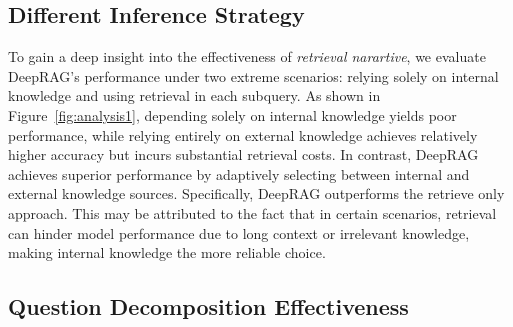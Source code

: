 \subsection{Different Inference Strategy}

To gain a deep insight into the effectiveness of \textit{retrieval narartive}, we evaluate DeepRAG's performance under two extreme scenarios: relying solely on internal knowledge and using retrieval in each subquery.
% 
As shown in Figure~\ref{fig:analysis1}, depending solely on internal knowledge yields poor performance, while relying entirely on external knowledge achieves relatively higher accuracy but incurs substantial retrieval costs.
In contrast, DeepRAG achieves superior performance by adaptively selecting between internal and external knowledge sources.
% 
Specifically, DeepRAG outperforms the retrieve only approach. This may be attributed to the fact that in certain scenarios, retrieval can hinder model performance due to long context or irrelevant knowledge, making internal knowledge the more reliable choice.

\subsection{Question Decomposition Effectiveness}



